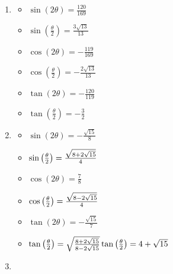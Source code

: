 \begin{enumerate}
\begin{multicols}{3}
\begin{itemize}
\end{itemize}

\end{multicols}

\item \begin{multicols}{3}

\begin{itemize}

\item $\sin(2\theta) = \frac{120}{169}$
\item $\sin\left(\frac{\theta}{2}\right) = \frac{3\sqrt{13}}{13}$
\item $\cos(2\theta) = -\frac{119}{169}$
\item $\cos\left(\frac{\theta}{2}\right) = -\frac{2\sqrt{13}}{13}$
\item $\tan(2\theta) = -\frac{120}{119}$
\item $\tan\left(\frac{\theta}{2}\right) = -\frac{3}{2}$

\end{itemize}

\end{multicols}

\item \begin{multicols}{3}

\begin{itemize}

\item $\sin(2\theta) = -\frac{\sqrt{15}}{8}$
\item $\sin\left(\frac{\theta}{2}\right) =\frac{\sqrt{8+2\sqrt{15}}}{4} \\ \phantom{\tan\left(\frac{\theta}{2}\right) = 4+\sqrt{15}}$ 
\item $\cos(2\theta) = \frac{7}{8}$
\item $\cos\left(\frac{\theta}{2}\right) = \frac{\sqrt{8-2\sqrt{15}}}{4} \\ \phantom{\tan\left(\frac{\theta}{2}\right) = 4+\sqrt{15}} $
\item $\tan(2\theta) = -\frac{\sqrt{15}}{7}$
\item $\tan\left(\frac{\theta}{2}\right) = \sqrt{\frac{8+2\sqrt{15}}{8-2\sqrt{15}}} \\ \tan\left(\frac{\theta}{2}\right) = 4+\sqrt{15}$

\end{itemize}

\end{multicols}

\item \begin{multicols}{3}


\end{multicols}
\end{enumerate}

